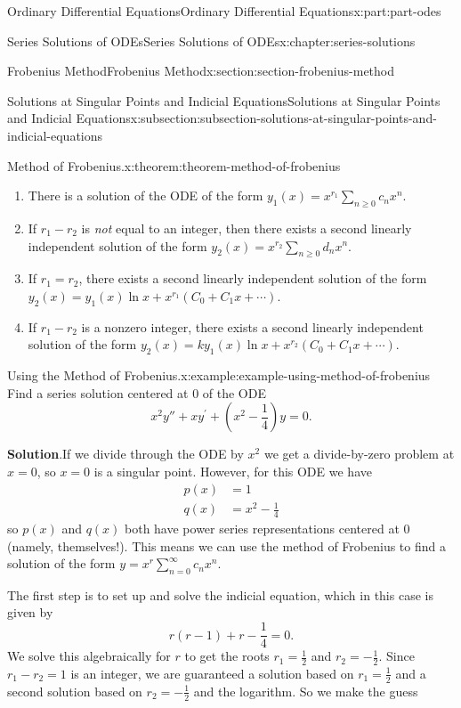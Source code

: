 \documentclass[oneside,10pt,]{book}
\newcommand{\blocktitlefont}{\relax}
\numberwithin{equation}{part}
\newcommand{\amp}{&}
\begin{document}
\begin{partptx}{Ordinary Differential Equations}{}{Ordinary Differential Equations}{}{}{x:part:part-odes}
\begin{chapterptx}{Series Solutions of ODEs}{}{Series Solutions of ODEs}{}{}{x:chapter:series-solutions}
\begin{sectionptx}{Frobenius Method}{}{Frobenius Method}{}{}{x:section:section-frobenius-method}
\begin{subsectionptx}{Solutions at Singular Points and Indicial Equations}{}{Solutions at Singular Points and Indicial Equations}{}{}{x:subsection:subsection-solutions-at-singular-points-and-indicial-equations}
\begin{theorem}{Method of Frobenius.}{}{x:theorem:theorem-method-of-frobenius}
\begin{enumerate}
\item{}There is a solution of the ODE of the form \(y_{1}(x) = x^{r_{1}}\sum_{n\geq0}^{}c_{n}x^{n}\).%
\item{}If \(r_{1}-r_{2}\) is \emph{not} equal to an integer, then there exists a second linearly independent solution of the form \(y_{2}(x) = x^{r_{2}}\sum_{n\geq0}^{}d_{n}x^{n}\).%
\item{}If \(r_{1} = r_{2}\), there exists a second linearly independent solution of the form \(y_{2}(x) = y_{1}(x)\ln x + x^{r_{1}}(C_{0} + C_{1}x + \cdots )\).%
\item{}If \(r_{1} - r_{2}\) is a nonzero integer, there exists a second linearly independent solution of the form \(y_{2}(x) = ky_{1}(x)\ln x + x^{r_{2}}(C_{0} + C_{1}x + \cdots )\).%
\end{enumerate}
%
\end{theorem}
\begin{example}{Using the Method of Frobenius.}{x:example:example-using-method-of-frobenius}%
Find a series solution centered at \(0\) of the ODE%
\begin{equation*}
x^{2}y''+xy^\prime+(x^{2}-\frac{1}{4})y=0.
\end{equation*}
%
\par\smallskip%
\noindent\textbf{\blocktitlefont Solution}.\hypertarget{g:solution:idp105548781325472}{}\quad{}If we divide through the ODE by \(x^{2}\) we get a divide-by-zero problem at \(x=0\), so \(x=0\) is a singular point. However, for this ODE we have%
\begin{align*}
p(x) \amp= 1\\
q(x) \amp= x^{2}-\frac{1}{4}
\end{align*}
so \(p(x)\) and \(q(x)\) both have power series representations centered at \(0\) (namely, themselves!). This means we can use the method of Frobenius to find a solution of the form \(y = x^r\sum_{n=0}^{\infty}c_n x^n\).%
\par
The first step is to set up and solve the indicial equation, which in this case is given by%
\begin{equation*}
r(r-1)+r-\frac{1}{4} = 0.
\end{equation*}
We solve this algebraically for \(r\) to get the roots \(r_{1}=\frac{1}{2}\) and \(r_{2}=-\frac{1}{2}\). Since \(r_{1}-r_{2} = 1\) is an integer, we are guaranteed a solution based on \(r_{1} = \frac{1}{2}\) and a second solution based on \(r_{2} = -\frac{1}{2}\) and the logarithm. So we make the guess%

\end{example}
\end{subsectionptx}
\end{sectionptx}
\end{chapterptx}
\end{partptx}
\end{document}
